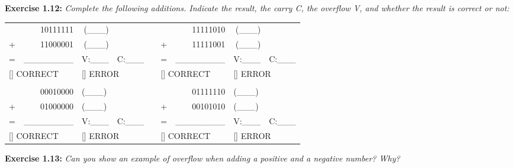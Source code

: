 \documentclass[12pt]{book}
\begin{document}
\noindent\textbf{Exercise 1.12:} \textit{Complete the following additions. Indicate the result, the carry C, the overflow V, and whether the result is correct or not:}
\begin{table}[H]
\begin{tabular}{lrllllrll}
       & 10111111                  & \multicolumn{1}{r}{(\_\_\_)} & \multicolumn{1}{c}{}         & \multicolumn{1}{c}{} &        & 11111010                  & \multicolumn{1}{r}{(\_\_\_)} &          \\
+      & 11000001                  & \multicolumn{1}{r}{(\_\_\_)} & \multicolumn{1}{c}{}         & \multicolumn{1}{c}{} & +      & 11111001                  & \multicolumn{1}{r}{(\_\_\_)} &          \\ \cline{1-3} \cline{6-8}
=      & \_\_\_\_\_\_\_\_          & V:\_\_\_                     & \multicolumn{1}{c}{C:\_\_\_} & \multicolumn{1}{c}{} & =      & \_\_\_\_\_\_\_\_          & V:\_\_\_                     & C:\_\_\_ \\
\multicolumn{2}{l}{[\;] CORRECT} & \multicolumn{2}{l}{[\;] ERROR}                            &                      & \multicolumn{2}{l}{[\;] CORRECT} & \multicolumn{2}{l}{[\;] ERROR}        \\
       & \multicolumn{1}{l}{}      &                              &                              &                      &        & \multicolumn{1}{l}{}      &                              &          \\
       & 00010000                  & (\_\_\_)                     &                              &                      &        & 01111110                  & (\_\_\_)                     &          \\
+      & 01000000                  & (\_\_\_)                     &                              &                      & +      & 00101010                  & (\_\_\_)                     &          \\ \cline{1-3} \cline{6-8}
=      & \_\_\_\_\_\_\_\_          & V:\_\_\_                     & C:\_\_\_                     &                      & =      & \_\_\_\_\_\_\_\_          & V:\_\_\_                     & C:\_\_\_ \\
\multicolumn{2}{l}{[\;] CORRECT} & \multicolumn{2}{l}{[\;] ERROR}                            &                      & \multicolumn{2}{l}{[\;] CORRECT} & \multicolumn{2}{l}{[\;] ERROR}        \\       
\end{tabular}
\end{table}
\noindent\textbf{Exercise 1.13:} \textit{Can you show an example of overflow when adding a positive and a negative number? Why?}\\
\end{document}
